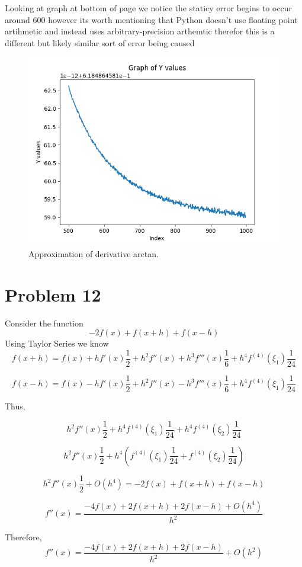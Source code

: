 \documentclass[]{article}
\begin{document}
	Looking at graph at bottom of page  we notice the staticy error begins to occur around 600 however its worth mentioning that Python doesn't use floating point artihmetic and instead uses arbitrary-precision arthemtic therefor this is a different but likely similar sort of error being caused
	
	\begin{figure}[h]  %
		\centering
		\includegraphics[width=1.5\textwidth]{Figure_1.png}  %
		\caption{Approximation of derivative arctan.}
		\label{fig:example_image}
	\end{figure}
	
	\section*{Problem 12}
	Consider the function
	\[-2f(x)+f(x+h)+f(x-h)\]
	Using Taylor Series we know
	\[f(x+h) = f(x) + h f'(x)\frac{1}{2} +h^2f''(x) +h^3f'''(x)\frac{1}{6} + h^4 f^{(4)}(\xi_1)\frac{1}{24}\]
	
	\[f(x-h) = f(x) - h f'(x)\frac{1}{2} +h^2f''(x) -h^3f'''(x)\frac{1}{6} + h^4 f^{(4)}(\xi_1)\frac{1}{24}\]
	
	Thus,
	
	\[h^2f''(x)\frac{1}{2} + h^4f^{(4)}(\xi_1)\frac{1}{24}+ h^4f^{(4)}(\xi_2)\frac{1}{24}\]
	
	\[h^2f''(x)\frac{1}{2} + h^4(f^{(4)}(\xi_1)\frac{1}{24}+ f^{(4)}(\xi_2)\frac{1}{24})\]
	
	\[h^2f''(x)\frac{1}{2} + O(h^4) = -2f(x)+f(x+h)+f(x-h)\]
	
	\[f''(x) = \frac{-4f(x)+2f(x+h)+2f(x-h) + O(h^4)}{h^2}\]
	
	Therefore,
	\[f''(x) = \frac{-4f(x)+2f(x+h)+2f(x-h)}{h^2} + O(h^2)\]
	
\end{document}
